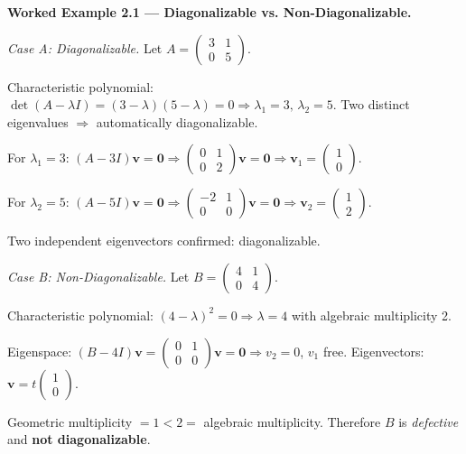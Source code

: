 \documentclass[12pt,a4paper]{article}
\begin{document}
\textbf{Worked Example 2.1 --- Diagonalizable vs. Non-Diagonalizable.}

\medskip
\textit{Case A: Diagonalizable.} Let $A = \begin{pmatrix} 3 & 1 \\ 0 & 5 \end{pmatrix}$.

Characteristic polynomial: $\det(A-\lambda I) = (3-\lambda)(5-\lambda) = 0 \Rightarrow \lambda_1 = 3,\, \lambda_2 = 5$.
Two distinct eigenvalues $\Rightarrow$ automatically diagonalizable.

For $\lambda_1 = 3$: $(A-3I)\mathbf{v} = \mathbf{0} \Rightarrow \begin{pmatrix}0&1\\0&2\end{pmatrix}\mathbf{v}=\mathbf{0} \Rightarrow \mathbf{v}_1 = \begin{pmatrix}1\\0\end{pmatrix}$.

For $\lambda_2 = 5$: $(A-5I)\mathbf{v} = \mathbf{0} \Rightarrow \begin{pmatrix}-2&1\\0&0\end{pmatrix}\mathbf{v}=\mathbf{0} \Rightarrow \mathbf{v}_2 = \begin{pmatrix}1\\2\end{pmatrix}$.

Two independent eigenvectors confirmed: diagonalizable.

\medskip
\textit{Case B: Non-Diagonalizable.} Let $B = \begin{pmatrix} 4 & 1 \\ 0 & 4 \end{pmatrix}$.

Characteristic polynomial: $(4-\lambda)^2 = 0 \Rightarrow \lambda = 4$ with algebraic multiplicity 2.

Eigenspace: $(B-4I)\mathbf{v} = \begin{pmatrix}0&1\\0&0\end{pmatrix}\mathbf{v} = \mathbf{0} \Rightarrow v_2 = 0$, $v_1$ free. Eigenvectors: $\mathbf{v} = t\begin{pmatrix}1\\0\end{pmatrix}$.

Geometric multiplicity $= 1 < 2 =$ algebraic multiplicity. Therefore $B$ is \emph{defective} and \textbf{not diagonalizable}.
\end{document}
